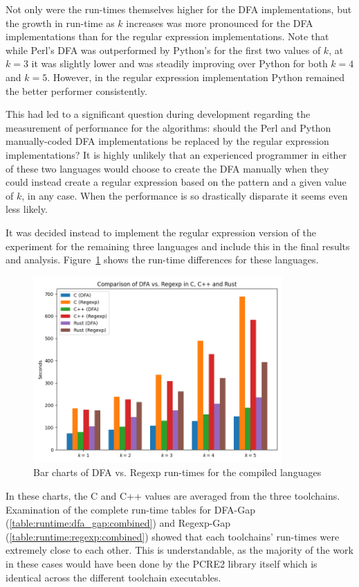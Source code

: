 Not only were the run-times themselves higher for the DFA implementations, but the growth in run-time as $k$ increases was more pronounced for the DFA implementations than for the regular expression implementations. Note that while Perl's DFA was outperformed by Python's for the first two values of $k$, at $k=3$ it was slightly lower and was steadily improving over Python for both $k=4$ and $k=5$. However, in the regular expression implementation Python remained the better performer consistently.

This had led to a significant question during development regarding the measurement of performance for the algorithms: should the Perl and Python manually-coded DFA implementations be replaced by the regular expression implementations? It is highly unlikely that an experienced programmer in either of these two languages would choose to create the DFA manually when they could instead create a regular expression based on the pattern and a given value of $k$, in any case. When the performance is so drastically disparate it seems even less likely.

It was decided instead to implement the regular expression version of the experiment for the remaining three languages and include this in the final results and analysis. Figure~\ref{fig:graph:dfa_regexp_comp2} shows the run-time differences for these languages.

\begin{figure}[h]
	\centering
	\includegraphics[width=0.85\textwidth]{figures/dfa_regexp_comp2.png}
	\caption{Bar charts of DFA vs. Regexp run-times for the compiled languages}
	\label{fig:graph:dfa_regexp_comp2}
\end{figure}

In these charts, the C and C++ values are averaged from the three toolchains. Examination of the complete run-time tables for DFA-Gap (\ref{table:runtime:dfa_gap:combined}) and Regexp-Gap (\ref{table:runtime:regexp:combined}) showed that each toolchains' run-times were extremely close to each other. This is understandable, as the majority of the work in these cases would have been done by the PCRE2 library itself which is identical across the different toolchain executables.

